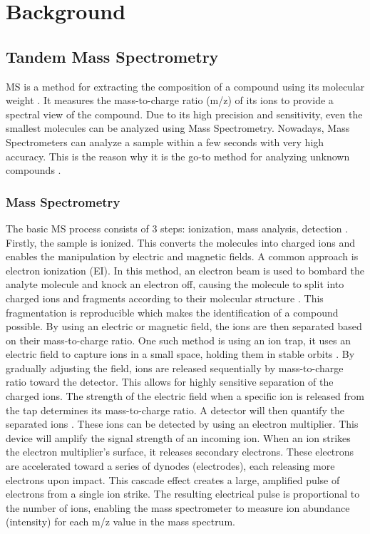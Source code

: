 \chapter{Background}
\label{chap:background}

\section{Tandem Mass Spectrometry}
\label{sec:tandemMS}

\ac{MS} is a method for extracting the composition of a compound using its molecular weight \cite{broad_mass_spectrometry}. It measures the mass-to-charge ratio (m/z) of its ions to provide a spectral view of the compound. Due to its high precision and sensitivity, even the smallest molecules can be analyzed using Mass Spectrometry. Nowadays, Mass Spectrometers can analyze a sample within a few seconds with very high accuracy. This is the reason why it is the go-to method for analyzing unknown compounds \cite{scripps_mass_spectrometry}.

\subsection{Mass Spectrometry}

The basic MS process consists of 3 steps: ionization, mass analysis, detection \cite{broad_mass_spectrometry, garg2024mass}.
Firstly, the sample is ionized. This converts the molecules into charged ions and enables the manipulation by electric and magnetic fields. A common approach is electron ionization (EI). In this method, an electron beam is used to bombard the analyte molecule and knock an electron off, causing the molecule to split into charged ions and fragments according to their molecular structure \cite{scottElectronIonization}. This fragmentation is reproducible which makes the identification of a compound possible.
By using an electric or magnetic field, the ions are then separated based on their mass-to-charge ratio. One such method is using an ion trap, it uses an electric field to capture ions in a small space, holding them in stable orbits \cite{garg2024mass, chong2018clinical}. By gradually adjusting the field, ions are released sequentially by mass-to-charge ratio toward the detector. This allows for highly sensitive separation of the charged ions. The strength of the electric field when a specific ion is released from the tap determines its mass-to-charge ratio.
A detector will then quantify the separated ions \cite{garg2024mass}. These ions can be detected by using an electron multiplier. This device will amplify the signal strength of an incoming ion. When an ion strikes the electron multiplier's surface, it releases secondary electrons. These electrons are accelerated toward a series of dynodes (electrodes), each releasing more electrons upon impact. This cascade effect creates a large, amplified pulse of electrons from a single ion strike. The resulting electrical pulse is proportional to the number of ions, enabling the mass spectrometer to measure ion abundance (intensity) for each m/z value in the mass spectrum.

